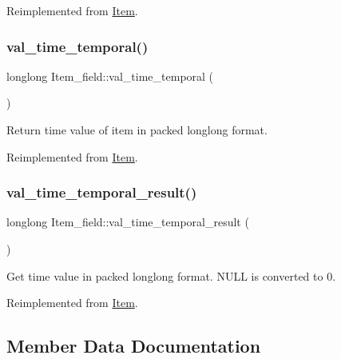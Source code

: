 Reimplemented from \mbox{\hyperlink{classItem_a57e763fcde2d0a819d21e31c59611290}{Item}}.

\mbox{\label{classItem__field_a9d9f8e906fb2f056b1bb4e907d8c783b}} 
\subsubsection{\texorpdfstring{val\+\_\+time\+\_\+temporal()}{val\_time\_temporal()}}
{\footnotesize\ttfamily longlong Item\+\_\+field\+::val\+\_\+time\+\_\+temporal (\begin{DoxyParamCaption}{ }\end{DoxyParamCaption})\hspace{0.3cm}{\ttfamily [virtual]}}

Return time value of item in packed longlong format. 

Reimplemented from \mbox{\hyperlink{classItem_a69ef60a3917a1bb4832498a695754c58}{Item}}.

\mbox{\label{classItem__field_a2f56e7eb6956ae5a02df47769a038c6a}} 
\subsubsection{\texorpdfstring{val\+\_\+time\+\_\+temporal\+\_\+result()}{val\_time\_temporal\_result()}}
{\footnotesize\ttfamily longlong Item\+\_\+field\+::val\+\_\+time\+\_\+temporal\+\_\+result (\begin{DoxyParamCaption}{ }\end{DoxyParamCaption})\hspace{0.3cm}{\ttfamily [virtual]}}

Get time value in packed longlong format. N\+U\+LL is converted to 0. 

Reimplemented from \mbox{\hyperlink{classItem_a9d011d3f1d2498f46bbdc4c06d47d5f0}{Item}}.



\subsection{Member Data Documentation}
\mbox{\label{classItem__field_a4bfe0257eb0875e8bb671a60997d55b3}} 
